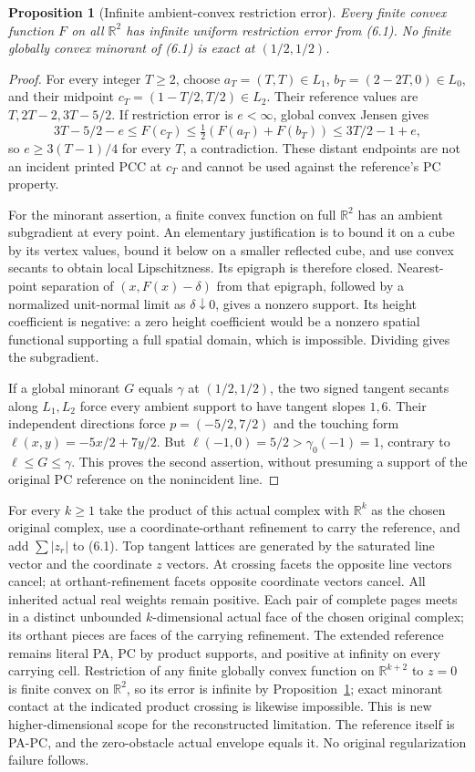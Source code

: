 \documentclass[11pt]{article}
\newtheorem{proposition}[theorem]{Proposition}
\newcommand{\R}{\mathbb R}
\begin{document}
\begin{proposition}[Infinite ambient-convex restriction error]\label{prop:ambient}
Every finite convex function $F$ on all $\R^2$ has infinite uniform restriction error from (6.1). No finite globally convex minorant of (6.1) is exact at $(1/2,1/2)$.
\end{proposition}
\begin{proof}
For every integer $T\geq2$, choose $a_T=(T,T)\in L_1$, $b_T=(2-2T,0)\in L_0$, and their midpoint $c_T=(1-T/2,T/2)\in L_2$. Their reference values are $T,2T-2,3T-5/2$. If restriction error is $e<\infty$, global convex Jensen gives
\[
 3T-5/2-e\leq F(c_T)\leq\tfrac12(F(a_T)+F(b_T))\leq3T/2-1+e,
\]
so $e\geq3(T-1)/4$ for every $T$, a contradiction. These distant endpoints are not an incident printed PCC at $c_T$ and cannot be used against the reference's PC property.

For the minorant assertion, a finite convex function on full $\R^2$ has an ambient subgradient at every point. An elementary justification is to bound it on a cube by its vertex values, bound it below on a smaller reflected cube, and use convex secants to obtain local Lipschitzness. Its epigraph is therefore closed. Nearest-point separation of $(x,F(x)-\delta)$ from that epigraph, followed by a normalized unit-normal limit as $\delta\downarrow0$, gives a nonzero support. Its height coefficient is negative: a zero height coefficient would be a nonzero spatial functional supporting a full spatial domain, which is impossible. Dividing gives the subgradient.

If a global minorant $G$ equals $\gamma$ at $(1/2,1/2)$, the two signed tangent secants along $L_1,L_2$ force every ambient support to have tangent slopes $1,6$. Their independent directions force $p=(-5/2,7/2)$ and the touching form $\ell(x,y)=-5x/2+7y/2$. But $\ell(-1,0)=5/2>\gamma_0(-1)=1$, contrary to $\ell\leq G\leq\gamma$. This proves the second assertion, without presuming a support of the original PC reference on the nonincident line.
\end{proof}

For every $k\geq1$ take the product of this actual complex with $\R^k$ as the chosen original complex, use a coordinate-orthant refinement to carry the reference, and add $\sum|z_r|$ to (6.1). Top tangent lattices are generated by the saturated line vector and the coordinate $z$ vectors. At crossing facets the opposite line vectors cancel; at orthant-refinement facets opposite coordinate vectors cancel. All inherited actual real weights remain positive. Each pair of complete pages meets in a distinct unbounded $k$-dimensional actual face of the chosen original complex; its orthant pieces are faces of the carrying refinement. The extended reference remains literal PA, PC by product supports, and positive at infinity on every carrying cell. Restriction of any finite globally convex function on $\R^{k+2}$ to $z=0$ is finite convex on $\R^2$, so its error is infinite by Proposition~\ref{prop:ambient}; exact minorant contact at the indicated product crossing is likewise impossible. This is new higher-dimensional scope for the reconstructed limitation. The reference itself is PA-PC, and the zero-obstacle actual envelope equals it. No original regularization failure follows.
\end{document}
